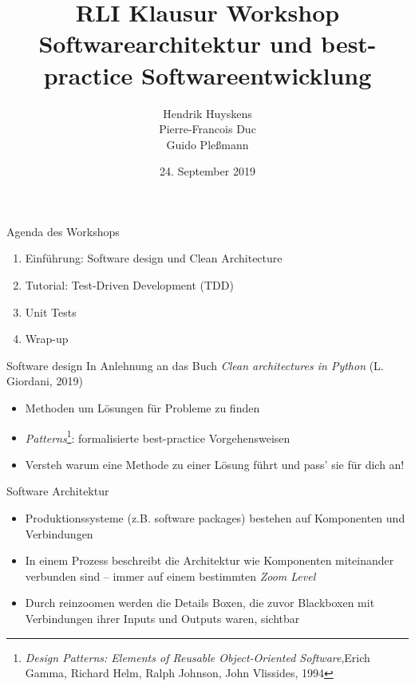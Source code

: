 \documentclass{beamer}
\title[Yo]{\textbf{RLI Klausur Workshop} \\ Softwarearchitektur und best-practice Softwareentwicklung}
\author{Hendrik Huyskens \\
Pierre-Francois Duc\\
Guido Pleßmann\\}
\institute{Reiner Lemoine Institut}
\date{24. September 2019}
\begin{document}
\begin{frame}
  \titlepage
\end{frame}

\begin{frame}{Agenda des Workshops}
 \begin{enumerate}
  \item Einführung: Software design und Clean Architecture
  \item Tutorial: Test-Driven Development (TDD)
  \item Unit Tests
  \item Wrap-up
 \end{enumerate}

\end{frame}

\begin{frame}{Software design}
In Anlehnung an das Buch \emph{Clean architectures in Python} (L. Giordani, 2019)
 
 \vspace{15pt}
 \begin{itemize}
  \item Methoden um Lösungen für Probleme zu finden
  \item \emph{Patterns}\footnote{\emph{Design Patterns: Elements of Reusable Object-Oriented Software},Erich Gamma, Richard Helm, Ralph Johnson, John Vlissides, 1994}: formalisierte best-practice Vorgehensweisen
  \item Versteh warum eine Methode zu einer Lösung führt und pass' sie für dich an!
 \end{itemize}
\end{frame}

\begin{frame}{Software Architektur}

\begin{itemize}
 \item Produktionssysteme (z.B. software packages) bestehen auf Komponenten und Verbindungen
 \item In einem Prozess beschreibt die Architektur wie Komponenten miteinander verbunden sind -- immer auf einem bestimmten \emph{Zoom Level}
 \item Durch reinzoomen werden die Details Boxen, die zuvor Blackboxen mit Verbindungen ihrer Inputs und Outputs waren, sichtbar
\end{itemize}

\end{frame}
\end{document}

